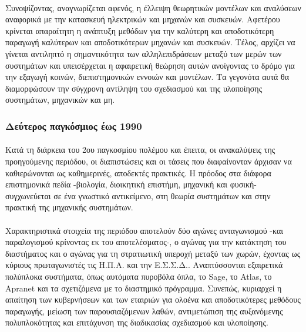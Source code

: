 \documentclass[a4paper,12pt,twoside]{report}
\begin{document}
{			\paragraph{}{Συνοψίζοντας, αναγνωρίζεται αφενός, η έλλειψη θεωρητικών μοντέλων και αναλύσεων αναφορικά με την κατασκευή ηλεκτρικών και μηχανών και συσκευών. Αφετέρου  κρίνεται απαραίτητη η ανάπτυξη μεθόδων για την καλύτερη και αποδοτικότερη παραγωγή καλύτερων και αποδοτικότερων μηχανών και συσκευών. Τέλος, αρχίζει να γίνεται αντιληπτό η σημαντικότητα των αλληλεπιδράσεων μεταξύ των μερών των συστημάτων και υπεισέρχεται η αφαιρετική θεώρηση αυτών ανοίγοντας το δρόμο για την εξαγωγή κοινών, διεπιστημονικών εννοιών και μοντέλων. Τα γεγονότα αυτά θα διαμορφώσουν την σύγχρονη αντίληψη του σχεδιασμού και της υλοποίησης συστημάτων, μηχανικών και μη.
			}

		\subsubsection{Δεύτερος παγκόσμιος έως 1990}
			
			\paragraph{}{Κατά τη διάρκεια του 2ου παγκοσμίου πολέμου και έπειτα, οι ανακαλύψεις της προηγούμενης περιόδου, οι διαπιστώσεις και οι τάσεις που διαφαίνονταν άρχισαν να καθιερώνονται ως καθημερινές, αποδεκτές πρακτικές. Η πρόοδος στα διάφορα επιστημονικά πεδία -βιολογία, διοικητική επιστήμη, μηχανική και φυσική- συγχωνεύεται σε ένα γνωστικό αντικείμενο, στη θεωρία συστημάτων και στην πρακτική της μηχανικής συστημάτων.
			}
			\paragraph{}{Χαρακτηριστικά στοιχεία της περιόδου αποτελούν δύο αγώνες ανταγωνισμού -και παραλογισμού κρίνοντας εκ του αποτελέσματος-, ο αγώνας για την κατάκτηση του διαστήματος και ο αγώνας για τη στρατιωτική υπεροχή μεταξύ των χωρών, έχοντας ως κύριους πρωταγωνιστές τις \acrshort{Η.Π.Α.} και την \acrshort{Ε.Σ.Σ.Δ.}. Αναπτύσσονται εξαιρετικά πολύπλοκα συστήματα, όπως αυτόματα πυροβόλα όπλα, το Sage, το Atlas, το Apranet και τα σχετιζόμενα με το διαστημικό πρόγραμμα. Συνεπώς, κυριαρχεί η απαίτηση των κυβερνήσεων και των εταιριών για ολοένα και αποδοτικότερες μεθόδους παραγωγής, μείωση των παρουσιαζόμενων λαθών, αντιμετώπιση της αυξανόμενης πολυπλοκότητας και επιτάχυνση της διαδικασίας σχεδιασμού και υλοποίησης.
			}
		
}
\end{document}
